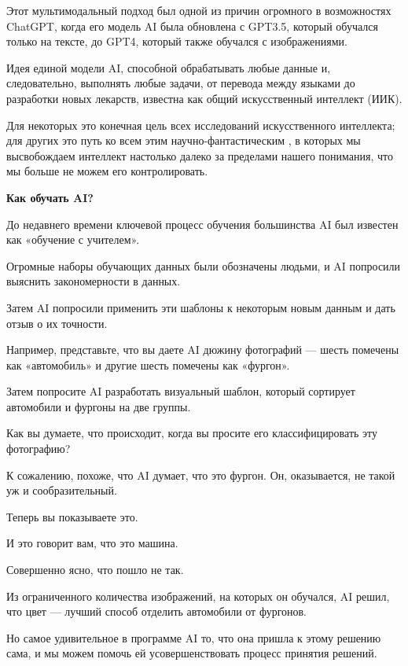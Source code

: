 Этот мультимодальный подход был одной из причин огромного  в возможностях ChatGPT, когда его модель AI была обновлена с GPT3.5, который обучался только на тексте, до GPT4, который также обучался с изображениями.

Идея единой модели AI, способной обрабатывать любые данные и, следовательно, выполнять любые задачи, от перевода между языками до разработки новых лекарств, известна как общий искусственный интеллект (ИИК).

Для некоторых это конечная цель всех исследований искусственного интеллекта; для других это путь ко всем этим научно-фантастическим , в которых мы высвобождаем интеллект настолько далеко за пределами нашего понимания, что мы больше не можем его контролировать.


\textbf{Как обучать AI?}

До недавнего времени ключевой процесс обучения большинства AI был известен как «обучение с учителем».

Огромные наборы обучающих данных были обозначены людьми, и AI попросили выяснить закономерности в данных.

Затем AI попросили применить эти шаблоны к некоторым новым данным и дать отзыв о их точности.

Например, представьте, что вы даете AI дюжину фотографий — шесть помечены как «автомобиль» и другие шесть помечены как «фургон».



Затем попросите AI разработать визуальный шаблон, который сортирует автомобили и фургоны на две группы.

Как вы думаете, что происходит, когда вы просите его классифицировать эту фотографию?



К сожалению, похоже, что AI думает, что это фургон. Он, оказывается, не такой уж и сообразительный.

Теперь вы показываете это.



И это говорит вам, что это машина.

Совершенно ясно, что пошло не так.

Из ограниченного количества изображений, на которых он обучался, AI решил, что цвет — лучший способ отделить автомобили от фургонов.

Но самое удивительное в программе AI то, что она пришла к этому решению сама, и мы можем помочь ей усовершенствовать процесс принятия решений.

